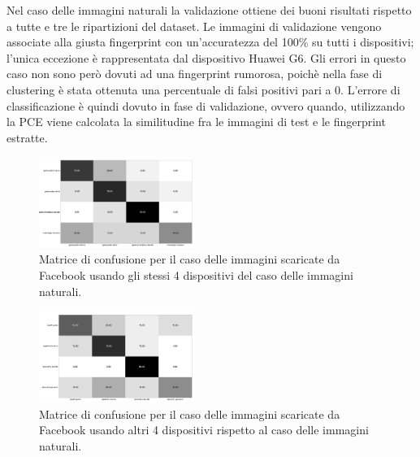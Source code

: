 Nel caso delle immagini naturali la validazione ottiene dei buoni risultati rispetto a tutte e tre le ripartizioni del dataset. Le immagini di validazione vengono associate alla giusta fingerprint con un'accuratezza del 100\% su tutti i dispositivi; l'unica eccezione è rappresentata dal dispositivo Huawei G6. Gli errori in questo caso non sono però dovuti ad una fingerprint rumorosa, poichè nella fase di clustering è stata ottenuta una percentuale di falsi positivi pari a 0. L'errore di classificazione è quindi dovuto in fase di validazione, ovvero quando, utilizzando la PCE viene calcolata la similitudine fra le immagini di test e le fingerprint estratte.

\begin{figure}[h]
\begin{center}
\includegraphics[width=0.45\textwidth]{images/confusion_matrix_fb_highres_4.png}
\end{center}
  \caption{Matrice di confusione per il caso delle immagini scaricate da Facebook usando gli stessi 4 dispositivi del caso delle immagini naturali. }
\label{fig:validation}
\end{figure}

\begin{figure}[h]
\begin{center}
\includegraphics[width=0.45\textwidth]{images/confusion_matrix_fb_highres_4_bis.png}
\end{center}
  \caption{Matrice di confusione per il caso delle immagini scaricate da Facebook usando altri 4 dispositivi rispetto al caso delle immagini naturali. }
\label{fig:validation}
\end{figure}

